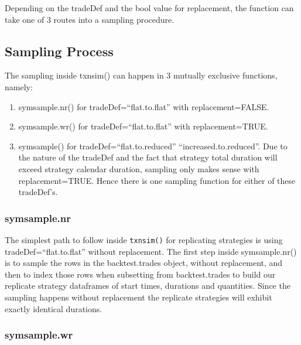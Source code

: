 Depending on the tradeDef and the bool value for replacement, the
function can take one of 3 routes into a sampling procedure.

\hypertarget{sampling-process}{%
\subsection{Sampling Process}\label{sampling-process}}

The sampling inside txnsim() can happen in 3 mutually exclusive
functions, namely:

\begin{enumerate}
\def\labelenumi{\arabic{enumi}.}
\tightlist
\item
  symsample.nr() for tradeDef=``flat.to.flat'' with replacement=FALSE.
\item
  symsample.wr() for tradeDef=``flat.to.flat'' with replacement=TRUE.
\item
  symsample() for tradeDef=``flat.to.reduced'' \textbar{}
  ``increased.to.reduced''. Due to the nature of the tradeDef and the
  fact that strategy total duration will exceed strategy calendar
  duration, sampling only makes sense with replacement=TRUE. Hence there
  is one sampling function for either of these tradeDef's.
\end{enumerate}

\hypertarget{symsample.nr}{%
\subsubsection{symsample.nr}\label{symsample.nr}}

The simplest path to follow inside \texttt{txnsim()} for replicating
strategies is using tradeDef=``flat.to.flat'' without replacement. The
first step inside symsample.nr() is to sample the rows in the
backtest.trades object, without replacement, and then to index those
rows when subsetting from backtest.trades to build our replicate
strategy dataframes of start times, durations and quantities. Since the
sampling happens without replacement the replicate strategies will
exhibit exactly identical durations.

\hypertarget{symsample.wr}{%
\subsubsection{symsample.wr}\label{symsample.wr}}

